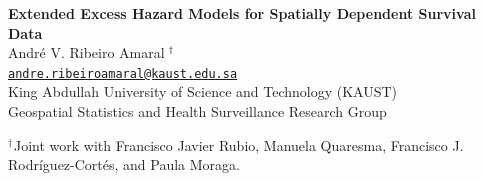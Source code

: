 \documentclass[10pt, aspectratio = 169, handout]{beamer} %
\author{André Victor Ribeiro Amaral}
\let\oldtextbf\textbf
\renewcommand\textbf[1]{\textcolor{titles}{\oldtextbf{#1}}}
\begin{document}
	\AtBeginSection{}
	{

        \begin{frame}[t]
            
            \centering
            \vspace{55pt}
            \textbf{{\large {}Extended Excess Hazard Models for Spatially Dependent Survival Data}} \\
            \vspace{15pt}
            {\normalsize André V.\hspace{1pt} Ribeiro Amaral${}^{\hspace{-1pt}~\dagger}$}\\
            {\scriptsize\texttt{\href{mailto:andre.ribeiroamaral@kaust.edu.sa}{andre.ribeiroamaral@kaust.edu.sa}}} \\
            \vspace{15pt}
            {\small King \hspace{-1pt}Abdullah\hspace{-1pt} University \hspace{-1pt}of Science\hspace{-1pt} and \hspace{-1pt}Technology \hspace{-2pt}(KAUST)}\\
            {\small Geospatial Statistics and Health Surveillance Research Group} \\ \vspace{15pt}

            \begin{flushleft} 
            {\small ${}^{\dagger\hspace{1pt}}$Joint work with Francisco Javier Rubio, Manuela Quaresma, Francisco J. Rodr\'iguez-Cort\'es, and Paula Moraga.}
            \end{flushleft}
        \end{frame}
  	}
\end{document}
